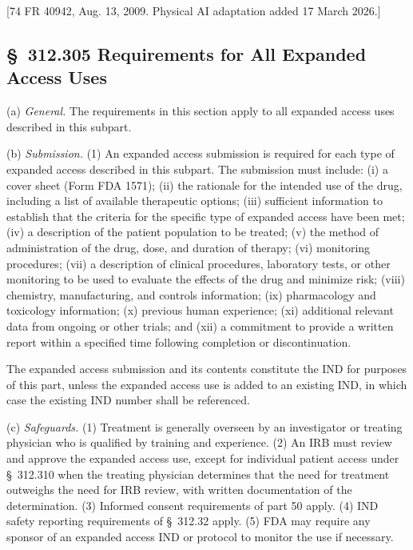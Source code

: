 [74 FR 40942, Aug. 13, 2009. Physical AI adaptation added 17 March 2026.]

\subsection{\S~312.305 Requirements for All Expanded Access Uses}

(a) \textit{General.} The requirements in this section apply to all expanded access uses described in this subpart.

(b) \textit{Submission.} (1) An expanded access submission is required for each type of expanded access described in this subpart. The submission must include: (i) a cover sheet (Form FDA 1571); (ii) the rationale for the intended use of the drug, including a list of available therapeutic options; (iii) sufficient information to establish that the criteria for the specific type of expanded access have been met; (iv) a description of the patient population to be treated; (v) the method of administration of the drug, dose, and duration of therapy; (vi) monitoring procedures; (vii) a description of clinical procedures, laboratory tests, or other monitoring to be used to evaluate the effects of the drug and minimize risk; (viii) chemistry, manufacturing, and controls information; (ix) pharmacology and toxicology information; (x) previous human experience; (xi) additional relevant data from ongoing or other trials; and (xii) a commitment to provide a written report within a specified time following completion or discontinuation.

\begin{description}[leftmargin=0.5cm,style=sameline]
\item[(2)] The expanded access submission and its contents constitute the IND for purposes of this part, unless the expanded access use is added to an existing IND, in which case the existing IND number shall be referenced.
\end{description}

(c) \textit{Safeguards.} (1) Treatment is generally overseen by an investigator or treating physician who is qualified by training and experience. (2) An IRB must review and approve the expanded access use, except for individual patient access under \S~312.310 when the treating physician determines that the need for treatment outweighs the need for IRB review, with written documentation of the determination. (3) Informed consent requirements of part 50 apply. (4) IND safety reporting requirements of \S~312.32 apply. (5) FDA may require any sponsor of an expanded access IND or protocol to monitor the use if necessary.

